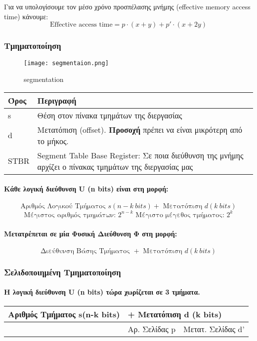 Για να υπολογίσουμε τον μέσο χρόνο προσπέλασης μνήμης (effective memory access time) κάνουμε:
$$ \text{Effective access time} = p \cdot (x+y) + p' \cdot (x+2y) $$

\subsubsection{Τμηματοποίηση}

\begin{figure}[H]
	\centering
	\texttt{[image: segmentaion.png]}
	\caption{segmentation}
\end{figure}

\begin{center}
\begin{tabularx}{0.5\textwidth}{|X|X|}
	\hline
	Όρος & Περιγραφή \\
	\hline
	s & Θέση στον πίνακα τμημάτων της διεργασίας \\
	\hline
	d & Μετατόπιση (offset). \textbf{Προσοχή} πρέπει να είναι μικρότερη από το μήκος. \\
	\hline
	STBR & {Segment Table Base Register: Σε ποια διεύθυνση
	της μνήμης αρχίζει ο πίνακας τμημάτων της διεργασίας μας} \\
	\hline
\end{tabularx}
\end{center}

\paragraph{Κάθε λογική διεύθυνση U (n bits) είναι στη μορφή:}
$$ \text{Αριθμός Λογικού Τμήματος }s (n-k~bits) + \text{ Μετατόπιση } d (k~bits) $$
$$ \text{Μέγιστος αριθμός τμημάτων: } 2^{n-k}\text{  Μέγιστο μέγεθος τμήματος: } 2^k $$
\paragraph{Μετατρέπεται σε μία Φυσική Διεύθυνση Φ στη μορφή:}
$$ \text{Διεύθυνση Βάσης Τμήματος } + \text{ Μετατόπιση } d (k~bits) $$

\subsubsection{Σελιδοποιημένη Τμηματοποίηση}

\paragraph{Η λογική διεύθυνση U (n bits) τώρα χωρίζεται σε 3 τμήματα.}
\begin{center}
\begin{tabularx}{0.95\textwidth}{|X|X|X|}
\hline
Αριθμός Τμήματος s(n-k bits) & \multicolumn{2}{|l|}{ + Μετατόπιση d (k bits)} \\
\hline
{} & Αρ. Σελίδας p & Μετατ. Σελίδας d' \\
\hline
\end{tabularx}
\end{center}

